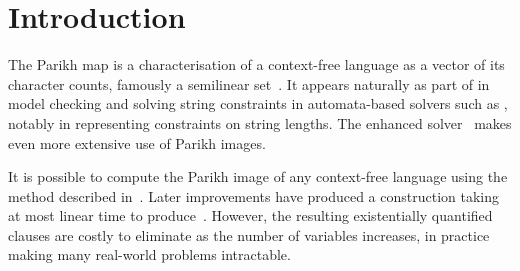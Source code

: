 \documentclass[acmsmall,review,anonymous,screen]{acmart}\settopmatter{printfolios=true,printccs=false,printacmref=true}
\theoremstyle{definition}
\begin{document}




\maketitle


\section{Introduction}

The Parikh map is a characterisation of a context-free language as a vector of
its character counts, famously a semilinear set~\cite{parikh-theorem}. It
appears naturally as part of  in model checking and
solving string constraints in automata-based solvers such as \Ostrich{}
\cite{ostrich}, notably in representing constraints on string lengths. The
enhanced \OstrichPlus{} solver~\cite{ostrich-plus} makes even more extensive use
of Parikh images.

It is possible to compute the Parikh image of any context-free language using
the method described in~\cite{generate-parikh-image}. Later improvements have
produced a construction taking at most linear time to
produce~\cite{muscholl-linear}. However, the resulting existentially quantified
clauses are costly to eliminate as the number of variables increases, in
practice making many real-world problems intractable.
\end{document}
